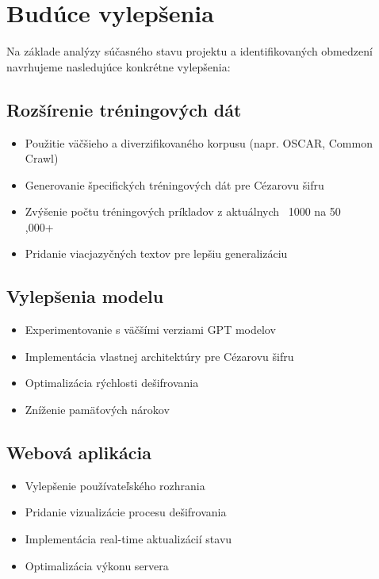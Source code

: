 \documentclass[12pt,a4paper]{article}
\begin{document}
\section{Budúce vylepšenia}
Na základe analýzy súčasného stavu projektu a identifikovaných obmedzení navrhujeme nasledujúce konkrétne vylepšenia:

\subsection{Rozšírenie tréningových dát}
\begin{itemize}
    \item Použitie väčšieho a diverzifikovaného korpusu (napr. OSCAR, Common Crawl)
    \item Generovanie špecifických tréningových dát pre Cézarovu šifru
    \item Zvýšenie počtu tréningových príkladov z aktuálnych ~1000 na 50\\,000+
    \item Pridanie viacjazyčných textov pre lepšiu generalizáciu
\end{itemize}

\subsection{Vylepšenia modelu}
\begin{itemize}
    \item Experimentovanie s väčšími verziami GPT modelov
    \item Implementácia vlastnej architektúry pre Cézarovu šifru
    \item Optimalizácia rýchlosti dešifrovania
    \item Zníženie pamäťových nárokov
\end{itemize}

\subsection{Webová aplikácia}
\begin{itemize}
    \item Vylepšenie používateľského rozhrania
    \item Pridanie vizualizácie procesu dešifrovania
    \item Implementácia real-time aktualizácií stavu
    \item Optimalizácia výkonu servera
\end{itemize}
\end{document}
